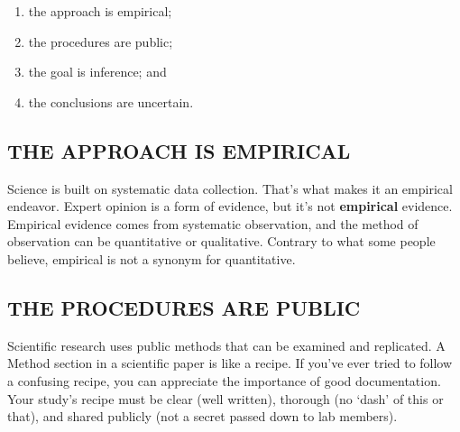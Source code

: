 \documentclass[
  letterpaper,
  DIV=11,
  numbers=noendperiod,
  oneside]{scrreprt}
\providecommand{\tightlist}{%
  \setlength{\itemsep}{0pt}\setlength{\parskip}{0pt}}\usepackage{longtable,booktabs,array}
\begin{document}
\begin{enumerate}
\def\labelenumi{\arabic{enumi}.}
\tightlist
\item
  the approach is empirical;
\item
  the procedures are public;
\item
  the goal is inference; and
\item
  the conclusions are uncertain.
\end{enumerate}

\hypertarget{the-approach-is-empirical}{%
\subsection*{THE APPROACH IS
EMPIRICAL}\label{the-approach-is-empirical}}


Science is built on systematic data collection. That's what makes it an
empirical endeavor. Expert opinion is a form of evidence, but it's not
\textbf{empirical} evidence. Empirical evidence comes from systematic
observation, and the method of observation can be quantitative or
qualitative. Contrary to what some people believe, empirical is not a
synonym for quantitative.

\hypertarget{the-procedures-are-public}{%
\subsection*{THE PROCEDURES ARE
PUBLIC}\label{the-procedures-are-public}}

Scientific research uses public methods that can be examined and
replicated. A Method section in a scientific paper is like a recipe. If
you've ever tried to follow a confusing recipe, you can appreciate the
importance of good documentation. Your study's recipe must be clear
(well written), thorough (no `dash' of this or that), and shared
publicly (not a secret passed down to lab members).
\end{document}
